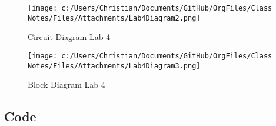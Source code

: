 \documentclass[11pt]{article}
\begin{document}
\begin{figure}[htbp]
\centering
\texttt{[image: c:/Users/Christian/Documents/GitHub/OrgFiles/Class Notes/Files/Attachments/Lab4Diagram2.png]}
\caption{Circuit Diagram Lab 4}
\end{figure}

\begin{figure}[htbp]
\centering
\texttt{[image: c:/Users/Christian/Documents/GitHub/OrgFiles/Class Notes/Files/Attachments/Lab4Diagram3.png]}
\caption{Block Diagram Lab 4}
\end{figure}

\clearpage
\subsection{Code}
\label{sec:org71d03dd}
\end{document}
